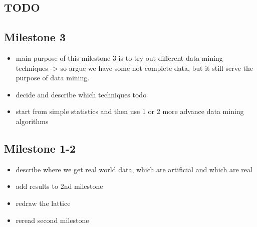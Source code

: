 \subsection{TODO} %
\label{sub:TODO}

\subsection{Milestone 3} %
\label{sub:Milestone 3}
\begin{itemize}
    \item main purpose of this milestone 3 is to try out different data mining techniques -> so argue we have some not complete data, but it still serve the purpose of data mining.
    \item decide and describe which techniques todo
    \item start from simple statistics and then use 1 or 2 more advance data mining algorithms
\end{itemize}


\subsection{Milestone 1-2} %
\label{sub:Milestone 1-2}

\begin{itemize}
    \item describe where we get real world data, which are artificial and which are real
    \item add results to 2nd milestone
    \item redraw the lattice
    \item reread second milestone
\end{itemize}

